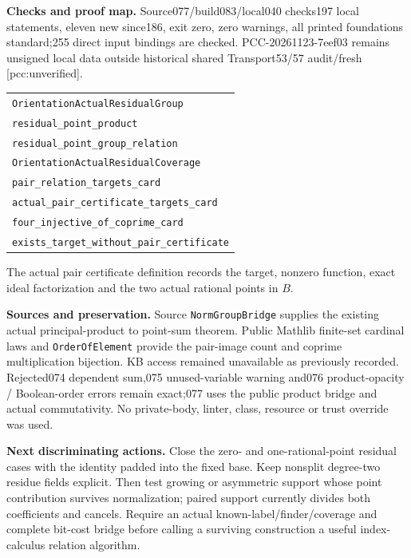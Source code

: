 \documentclass[11pt]{article}
\begin{document}
\textbf{Checks and proof map.}
Source077/build083/local040 checks197 local statements, eleven new since186,
exit zero, zero warnings, all printed foundations standard;255 direct input
bindings are checked. PCC-20261123-7eef03 remains unsigned local data outside
historical shared Transport53/57 audit/fresh [pcc:unverified].
\begin{center}\begin{tabular}{l}
\texttt{OrientationActualResidualGroup}\\
\texttt{residual\_point\_product}\\
\texttt{residual\_point\_group\_relation}\\[4pt]
\texttt{OrientationActualResidualCoverage}\\
\texttt{pair\_relation\_targets\_card}\\
\texttt{actual\_pair\_certificate\_targets\_card}\\
\texttt{four\_injective\_of\_coprime\_card}\\
\texttt{exists\_target\_without\_pair\_certificate}
\end{tabular}\end{center}
The actual pair certificate definition records the target, nonzero function,
exact ideal factorization and the two actual rational points in \(B\).

\textbf{Sources and preservation.}
Source \texttt{NormGroupBridge} supplies the existing actual principal-product
to point-sum theorem. Public Mathlib finite-set cardinal laws and
\texttt{OrderOfElement} provide the pair-image count and coprime multiplication
bijection. KB access remained unavailable as previously recorded.
Rejected074 dependent sum,075 unused-variable warning and076 product-opacity /
Boolean-order errors remain exact;077 uses the public product bridge and actual
commutativity. No private-body, linter, class, resource or trust override was used.

\textbf{Next discriminating actions.}
Close the zero- and one-rational-point residual cases with the identity padded
into the fixed base. Keep nonsplit degree-two residue fields explicit.
Then test growing or asymmetric support whose point contribution survives
normalization; paired support currently divides both coefficients and cancels.
Require an actual known-label/finder/coverage and complete bit-cost bridge before
calling a surviving construction a useful index-calculus relation algorithm.
\end{document}
